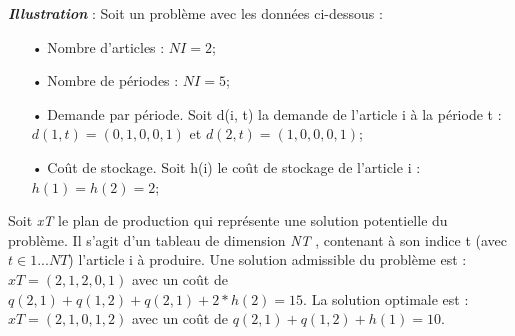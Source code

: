 \documentclass[12pt,a4paper]{article}
\begin{document}
	\textbf{\textsl{Illustration}} : Soit un problème avec les données ci-dessous : \\
	\begin{itemize}
		\item[•] Nombre d’articles : $NI = 2$;
		\item[•] Nombre de périodes : $NI = 5$;
		\item[•] Demande par période. Soit d(i, t) la demande de l’article i à la période t : $d(1, t) = (0, 1, 0, 0, 1)$ et $d(2, t) = (1, 0, 0, 0, 1)$;
		\item[•] Coût de stockage. Soit h(i) le coût de stockage de l’article i : $h(1) = h(2) = 2$;
	\end{itemize}
	Soit \emph{xT} le plan de production qui représente une solution potentielle du problème. Il s’agit d’un tableau de dimension \emph{NT} , contenant à son indice t (avec $t  \in  {1...NT}$) l’article i à produire. Une solution admissible du problème est : $ xT = (2, 1, 2, 0, 1)$ avec un coût de $ q(2, 1) + q(1, 2) + q(2, 1) + 2 * h(2) = 15 $. La solution optimale est : $ xT = (2, 1, 0, 1, 2)$ avec un coût de $q(2, 1) + q(1, 2) + h(1) = 10$.
		
\end{document}
